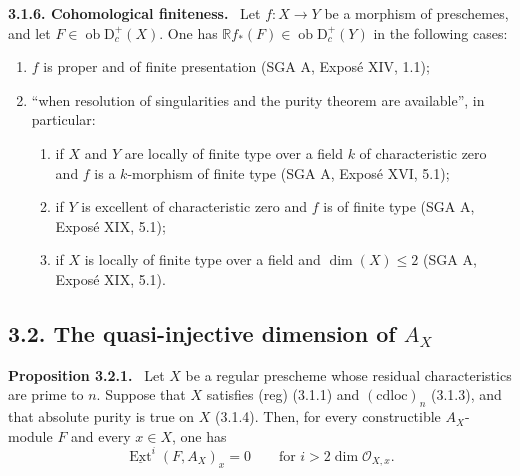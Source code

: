 \documentclass[11pt]{article}
\providecommand{\cO}{\mathcal{O}}
\providecommand{\uExt}{\underline{\Ext}}
\newenvironment{statement}[1]{\par\medskip\noindent\textbf{#1.}\ }{\par\medskip}
\DeclareMathOperator{\Ext}{Ext}
\newcommand{\D}{\mathrm{D}}
\newcommand{\ob}{\operatorname{ob}}
\providecommand{\ob}{\operatorname{ob}}
\begin{document}
\begin{statement}{3.1.6. Cohomological finiteness}
Let $f:X\to Y$ be a morphism of preschemes, and let $F\in\ob\D_c^+(X)$. One has $\mathbb{R} f_*(F)\in\ob\D_c^+(Y)$ in the following cases:
\begin{enumerate}[label=\alph*)]
\item $f$ is proper and of finite presentation (SGA A, Exposé XIV, 1.1);
\item ``when resolution of singularities and the purity theorem are available'', in particular:
\begin{enumerate}[label=(\roman*)]
\item if $X$ and $Y$ are locally of finite type over a field $k$ of characteristic zero and $f$ is a $k$-morphism of finite type (SGA A, Exposé XVI, 5.1);
\item if $Y$ is excellent of characteristic zero and $f$ is of finite type (SGA A, Exposé XIX, 5.1);
\item if $X$ is locally of finite type over a field and $\dim(X)\le2$ (SGA A, Exposé XIX, 5.1).
\end{enumerate}
\end{enumerate}
\end{statement}

\subsection*{3.2. The quasi-injective dimension of $A_X$}

\begin{statement}{Proposition 3.2.1}
Let $X$ be a regular prescheme whose residual characteristics are prime to $n$. Suppose that $X$ satisfies (reg) (3.1.1) and $(\mathrm{cdloc})_n$ (3.1.3), and that absolute purity is true on $X$ (3.1.4). Then, for every constructible $A_X$-module $F$ and every $x\in X$, one has
\begin{equation}
\uExt^i(F,A_X)_x=0\qquad\text{for } i>2\dim\cO_{X,x}.\tag{*}
\end{equation}
\end{statement}
\end{document}
